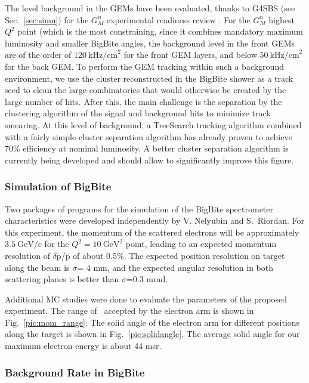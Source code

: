 The level background in the GEMs have been evaluated, thanks to G4SBS (see Sec.~\ref{sec:simu}) for the $G_M^n$ experimental readiness review \cite{gmn_err}. For the $G_M^n$ highest $Q^2$ point (which is the most constraining, since it combines mandatory maximum luminosity and smaller BigBite angles, the background level in the front GEMs are of the order of $120~\mathrm{kHz/cm}^2$ for the front GEM layers, and below $50~\mathrm{kHz/cm}^2$ for the back GEM.
To perform the GEM tracking within such a background environment, we use the cluster reconstructed in the BigBite shower as a track seed to clean the large combinatorics that would otherwise be created by the large number of hits. After this, the main challenge is the separation by the clustering algorithm of the signal and background hits to minimize track smearing.
At this level of background, a TreeSearch tracking algorithm combined with a fairly simple cluster separation algorithm has already proven to achieve 70\% efficiency at nominal luminosity.
A better cluster separation algorithm is currently being developed and should allow to significantly improve this figure. 

\iffalse
\subsubsection{Simulation of BigBite}

Two packages of programs for the simulation of the BigBite spectrometer characteristics
were developed independently by V. Nelyubin \cite{nel01} and S.~Riordan.  
For this experiment, the momentum of the scattered electrons will be approximately $\mathrm{3.5~\mathrm{GeV/c}}$ for the $Q^2 = 10~\mathrm{GeV}^2$ point, 
leading to an expected momentum resolution of $\delta$p/p  of about 0.5\%.  
The expected position resolution on target
along the beam is $\sigma$= 4 mm, and the expected angular resolution in both 
scattering planes is better than $\sigma$=0.3 mrad.  

Additional MC studies were done to evaluate the parameters of the proposed experiment.  
The range of \qsq~accepted by the electron arm is shown in Fig.~\ref{pic:mom_range}. 
The solid angle of the electron arm for different positions along the target is shown in Fig.~\ref{pic:solidangle}.  
The average solid angle for our maximum electron energy is about 44 msr.
%

\subsubsection{Background Rate in BigBite}

